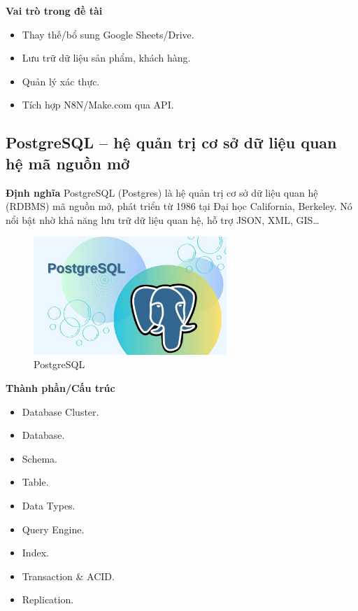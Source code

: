 \textbf{Vai trò trong đề tài}
\begin{itemize}
    \item Thay thế/bổ sung Google Sheets/Drive.
    \item Lưu trữ dữ liệu sản phẩm, khách hàng.
    \item Quản lý xác thực.
    \item Tích hợp N8N/Make.com qua API.
\end{itemize}




\subsection{PostgreSQL – hệ quản trị cơ sở dữ liệu quan hệ mã nguồn mở}

\textbf{Định nghĩa}
PostgreSQL (Postgres) là hệ quản trị cơ sở dữ liệu quan hệ (RDBMS) mã nguồn mở, phát triển từ 1986 tại Đại học California, Berkeley. Nó nổi bật nhờ khả năng lưu trữ dữ liệu quan hệ, hỗ trợ JSON, XML, GIS\dots

\begin{figure}[h!]
    \centering
    \includegraphics[width=0.65\textwidth]{img/Picture9.png}
    
    \caption{ PostgreSQL}
    \label{fig:postgresSLQ}
\end{figure}

\textbf{Thành phần/Cấu trúc}
\begin{itemize}
    \item Database Cluster.
    \item Database.
    \item Schema.
    \item Table.
    \item Data Types.
    \item Query Engine.
    \item Index.
    \item Transaction \& ACID.
    \item Replication.
\end{itemize}

